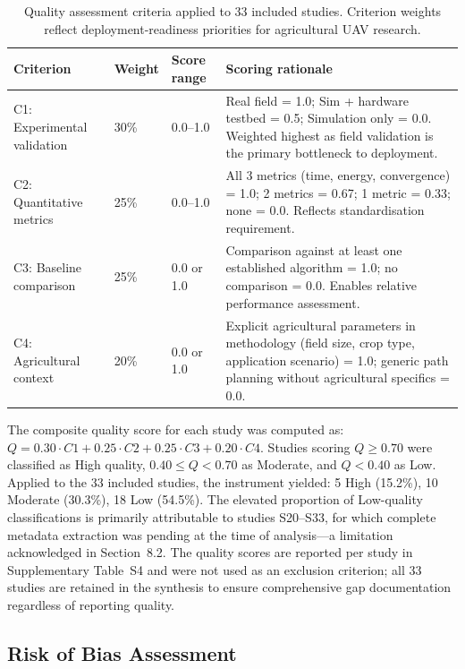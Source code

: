 \documentclass[review,3p,times]{elsarticle}
\begin{document}
\begin{table}[htbp]
\centering
\caption{Quality assessment criteria applied to 33 included studies. Criterion weights reflect deployment-readiness priorities for agricultural UAV research.}
\label{tab:quality_criteria}
\begin{tabularx}{\textwidth}{lllX}
\toprule
\textbf{Criterion} & \textbf{Weight} & \textbf{Score range} & \textbf{Scoring rationale} \\
\midrule
C1: Experimental validation & 30\% & 0.0--1.0 & Real field = 1.0; Sim + hardware testbed = 0.5; Simulation only = 0.0. Weighted highest as field validation is the primary bottleneck to deployment. \\
C2: Quantitative metrics & 25\% & 0.0--1.0 & All 3 metrics (time, energy, convergence) = 1.0; 2 metrics = 0.67; 1 metric = 0.33; none = 0.0. Reflects standardisation requirement. \\
C3: Baseline comparison & 25\% & 0.0 or 1.0 & Comparison against at least one established algorithm = 1.0; no comparison = 0.0. Enables relative performance assessment. \\
C4: Agricultural context & 20\% & 0.0 or 1.0 & Explicit agricultural parameters in methodology (field size, crop type, application scenario) = 1.0; generic path planning without agricultural specifics = 0.0. \\
\bottomrule
\end{tabularx}
\end{table}

The composite quality score for each study was computed as: $Q = 0.30 \cdot C1 + 0.25 \cdot C2 + 0.25 \cdot C3 + 0.20 \cdot C4$. Studies scoring $Q \geq 0.70$ were classified as High quality, $0.40 \leq Q < 0.70$ as Moderate, and $Q < 0.40$ as Low. Applied to the 33 included studies, the instrument yielded: 5 High (15.2\%), 10 Moderate (30.3\%), 18 Low (54.5\%). The elevated proportion of Low-quality classifications is primarily attributable to studies S20--S33, for which complete metadata extraction was pending at the time of analysis---a limitation acknowledged in Section~8.2. The quality scores are reported per study in Supplementary Table~S4 and were not used as an exclusion criterion; all 33 studies are retained in the synthesis to ensure comprehensive gap documentation regardless of reporting quality.

\subsection{Risk of Bias Assessment}
\end{document}

